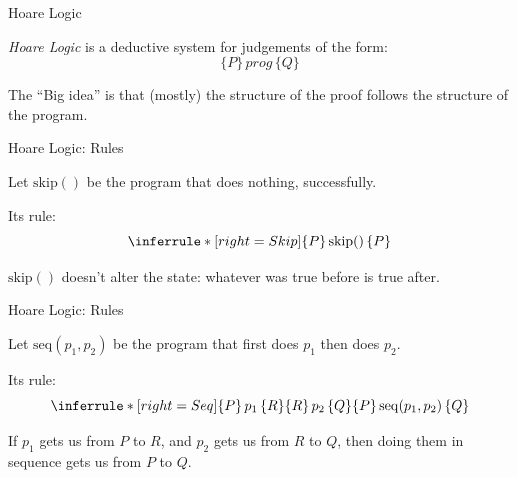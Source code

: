 \documentclass[xetex,aspectratio=169,14pt,hyperref={pdfpagelabels=true,pdflang={en-GB}}]{beamer}
\begin{document}
\begin{frame}
  {Hoare Logic}

  \emph{Hoare Logic} is a deductive system for judgements of the form:
  \begin{displaymath}
    \{ P \}\, \mathit{prog}\, \{ Q \}
  \end{displaymath}

  \bigskip

  The ``Big idea'' is that (mostly) the structure of the proof follows
  the structure of the program.


\end{frame}




\begin{frame}
  {Hoare Logic: Rules}

  Let $\mathrm{skip}()$ be the program that does nothing, successfully.

  \bigskip

  Its rule:
  \begin{displaymath}
    \inferrule* [right=Skip]
    { }
    {\{ P \}\, \mathrm{skip}()\, \{ P \}}
  \end{displaymath}

  \bigskip

  $\mathrm{skip}()$ doesn't alter the state: whatever was true before is true after.
\end{frame}

\begin{frame}
  {Hoare Logic: Rules}

  Let $\mathrm{seq}(p_1,p_2)$ be the program that first does $p_1$ then does $p_2$.

  \bigskip

  Its rule:
  \begin{displaymath}
    \inferrule* [right=Seq]
    {\{ P \}\,p_1\,\{ R \} \\ \{ R \}\,p_2\,\{ Q \}}
    {\{ P \}\,\mathrm{seq}(p_1,p_2)\,\{ Q \}}
  \end{displaymath}

  \bigskip

  If $p_1$ gets us from $P$ to $R$, and $p_2$ gets us from $R$ to $Q$,
  then doing them in sequence gets us from $P$ to $Q$.
\end{frame}
\end{document}
